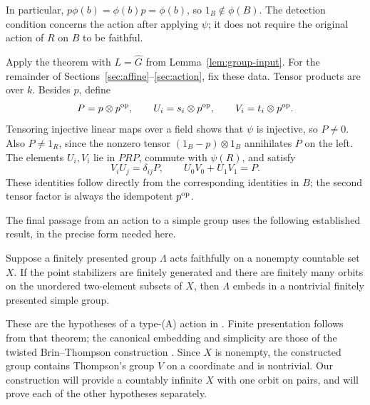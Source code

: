 In particular, \(p\phi(b)=\phi(b)p=\phi(b)\), so
\(1_B\notin\phi(B)\). The detection condition concerns the action
after applying \(\psi\); it does not require the original action of
\(R\) on \(B\) to be faithful.

Apply the theorem with \(L=\widehat G\) from
Lemma~\ref{lem:group-input}. For the remainder of
Sections~\ref{sec:affine}--\ref{sec:action}, fix these data. Tensor
products are over \(k\). Besides \(p\), define
\[
 P=p\otimes p^{\mathrm{op}},\qquad
 U_i=s_i\otimes p^{\mathrm{op}},\qquad
 V_i=t_i\otimes p^{\mathrm{op}}.
\]
Tensoring injective linear maps over a field shows that \(\psi\) is
injective, so \(P\ne0\). Also \(P\ne1_R\), since the nonzero tensor
\((1_B-p)\otimes1_B\) annihilates \(P\) on the left.
The elements \(U_i,V_i\) lie in \(PRP\), commute with
\(\psi(R)\), and satisfy
\begin{equation}\label{eq:ring-pairs}
 V_iU_j=\delta_{ij}P,\qquad U_0V_0+U_1V_1=P.
\end{equation}
These identities follow directly from the corresponding identities
in \(B\); the second tensor factor is always the idempotent \(p^{\mathrm{op}}\).

The final passage from an action to a simple group uses the following
established result, in the precise form needed here.

\begin{theorem}[Zaremsky]\label{thm:zaremsky}
Suppose a finitely presented group \(\Lambda\) acts faithfully on a
nonempty countable set \(X\). If the point stabilizers are finitely
generated and there are finitely many orbits on the unordered
two-element subsets of \(X\), then \(\Lambda\) embeds in a nontrivial
finitely presented simple group.
\end{theorem}

These are the hypotheses of a type-\textup{(A)} action in
\cite[Theorem~A and Corollary~B]{Zaremsky2024Finite}.
Finite presentation follows from that theorem; the canonical embedding
and simplicity are those of the twisted Brin--Thompson construction
\cite[Section~3 and Theorem~3.4]{BelkZaremsky2022}. Since \(X\) is nonempty, the
constructed group contains Thompson's group \(V\) on a coordinate and
is nontrivial. Our construction will provide a countably infinite \(X\)
with one orbit on pairs, and will prove each of the other hypotheses
separately.
